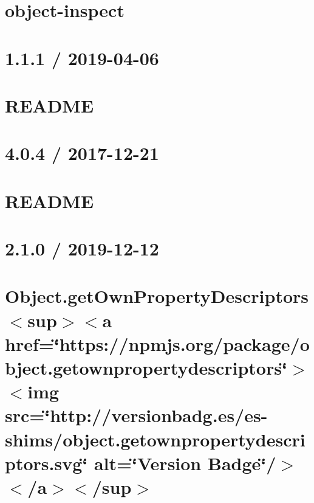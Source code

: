 \let\mypdfximage\pdfximage\def\pdfximage{\immediate\mypdfximage}\documentclass[twoside]{book}
\newcommand{\+}{\discretionary{\mbox{\scriptsize$\hookleftarrow$}}{}{}}
\begin{document}
\chapter{object-\/inspect}
\label{md_heap-visualizer_node_modules_object-inspect_readme}

\chapter{1.1.1 / 2019-\/04-\/06}
\label{md_heap-visualizer_node_modules_object-keys__c_h_a_n_g_e_l_o_g}

\chapter{R\+E\+A\+D\+ME}
\label{md_heap-visualizer_node_modules_object-keys__r_e_a_d_m_e}

\chapter{4.0.4 / 2017-\/12-\/21}
\label{md_heap-visualizer_node_modules_object_8assign__c_h_a_n_g_e_l_o_g}

\chapter{R\+E\+A\+D\+ME}
\label{md_heap-visualizer_node_modules_object_8assign__r_e_a_d_m_e}

\chapter{2.1.0 / 2019-\/12-\/12}
\label{md_heap-visualizer_node_modules_object_8getownpropertydescriptors__c_h_a_n_g_e_l_o_g}

\chapter{Object.\+get\+Own\+Property\+Descriptors $<$sup$>$$<$a href=\char`\"{}https\+://npmjs.\+org/package/object.\+getownpropertydescriptors\char`\"{}$>$$<$img src=\char`\"{}http\+://versionbadg.\+es/es-\/shims/object.\+getownpropertydescriptors.\+svg\char`\"{} alt=\char`\"{}\+Version Badge\char`\"{}/$>$$<$/a$>$$<$/sup$>$}
\label{md_heap-visualizer_node_modules_object_8getownpropertydescriptors__r_e_a_d_m_e}

\end{document}
